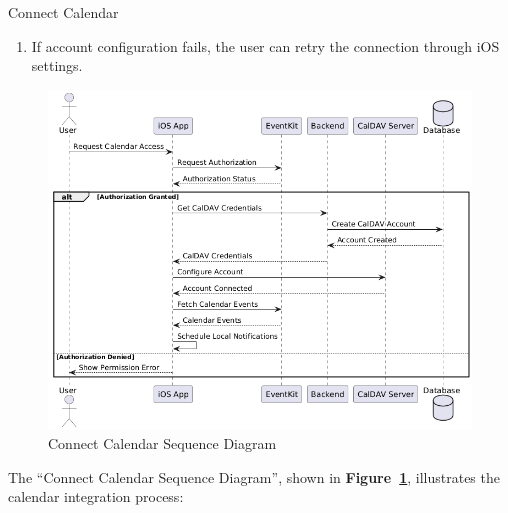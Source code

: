 \begin{usecase}{Connect Calendar}
{\begin{enumerate}
            \item If account configuration fails, the user can retry the connection through iOS settings.
        \end{enumerate}
    }
\end{usecase}

\begin{figure}[!h]
    \centering
    \includegraphics[width=\textwidth]{images/docs/diagrams/sequence-diagrams/all-sequence-diagrams/Connect Calendar.png}
    \caption{Connect Calendar Sequence Diagram}
    \label{fig:seq/connect-calendar}
\end{figure}

The ``Connect Calendar Sequence Diagram'', shown in \textbf{Figure~\ref{fig:seq/connect-calendar}}, illustrates the calendar integration process:

